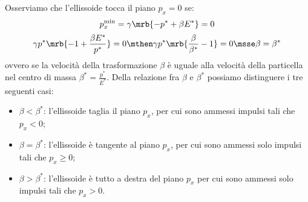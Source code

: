 Osserviamo che l'ellissoide tocca il piano $p_x = 0$ se:
\begin{equation}
	p_{x}^{\text{min}} = \gamma\mrb{-p^\ast + \beta E^\ast} = 0
\end{equation}
\begin{equation}
	\gamma p^\ast\mrb{- 1 + \frac{\beta E^\ast}{p^\ast}} = 0
	\mthen
	\gamma p^\ast\mrb{\frac{\beta}{\beta^\ast} - 1} = 0
	\msse
	\beta = \beta^\ast
\end{equation}
ovvero se la velocità della trasformazione $\beta$ è uguale alla velocità della
particella nel centro di massa $\beta^\ast = \frac{p^\ast}{E^\ast}$.
Della relazione fra $\beta$ e $\beta^\ast$ possiamo distinguere i tre seguenti
casi:
\begin{itemize}
	\item $\beta < \beta^\ast$: l'ellissoide taglia il piano $p_x$, per cui sono
	      ammessi impulsi tali che $p_x < 0$;
	\item $\beta = \beta^\ast$: l'ellissoide è tangente al piano $p_x$, per cui
	      sono ammessi solo impulsi tali che $p_x \geq 0$;
	\item $\beta > \beta^\ast$: l'ellissoide è tutto a destra del piano $p_x$ per
	      cui sono ammessi solo impulsi tali che $p_x > 0$.
\end{itemize}
